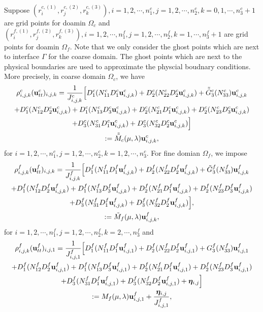 \documentclass[a4paper]{article}
\begin{document}
Suppose $(r^{c,(1)}_i, r^{c,(2)}_j, r^{c,(3)}_k), i = 1,2,\cdots,n_1^c, j = 1,2,\cdots,n_2^c,k=0,1,\cdots,n_3^c+1$ are grid points for doamin $\Omega_c$ and   $(r^{f,(1)}_i, r^{f,(2)}_j, r^{f,(3)}_k), i = 1,2,\cdots,n_1^f, j = 1,2,\cdots,n_2^f,k=1,\cdots,n_3^f+1$ are grid points for doamin $\Omega_f$. Note that we only consider the ghost points which are next to interface $\Gamma$ for the coarse domain. The ghost points which are next to the physical boundaries are used to approximate the physcial boudnary conditions. More precisely, in coarse domain $\Omega_c$, we have
\begin{multline}\label{coarse_scheme}
\rho_{i,j,k}^c ({\bf u}_{tt}^c)_{i,j,k} = \frac{1}{J_{i,j,k}^c}\Big[D_1^c(N_{11}^cD_1^c{\bf u}_{i,j,k}^c)+D_2^c(N_{22}^cD_2^c{\bf u}_{i,j,k}^c)+\tilde{\tilde{G}}_3^c(N_{33}^c){\bf u}_{i,j,k}^c\\
+D_1^c(N_{12}^cD_2^c{\bf u}_{i,j,k}^c)+D_1^c(N_{13}^cD_3^c{\bf u}_{i,j,k}^c)+D_2^c(N_{21}^cD_1^c{\bf u}_{i,j,k}^c)+D_2^c(N_{23}^cD_3^c{\bf u}_{i,j,k}^c)\\
+D_3^c(N_{31}^cD_1^c{\bf u}_{i,j,k}^c)+D_3^c(N_{32}^cD_2^c{\bf u}_{i,j,k}^c)\Big] \\
:= \tilde{\tilde{M}}_c(\mu,\lambda) {\bf{u}}^c_{i,j,k},
\end{multline}
for $ i = 1,2,\cdots,n_1^c, j = 1,2,\cdots,n_2^c, k = 1,2,\cdots,n_3^c$. For fine domian $\Omega_f$, we impose
\begin{multline}\label{fine_scheme_2}
\rho_{i,j,k}^f ({\bf u}_{tt}^f)_{i,j,k} =
 \frac{1}{J_{i,j,k}^f}\Big[D_1^f(N_{11}^fD_1^f{\bf u}_{i,j,k}^f)+D_2^f(N_{22}^fD_2^f{\bf u}_{i,j,k}^f)+\tilde{G}_3^f(N_{33}^f){\bf u}_{i,j,k}^f\\
+D_1^f(N_{12}^fD_2^f{\bf u}_{i,j,k}^f)+D_1^f(N_{13}^fD_3^f{\bf u}_{i,j,k}^f)
+D_2^f(N_{21}^fD_1^f{\bf u}_{i,j,k}^f)+D_2^f(N_{23}^fD_3^f{\bf u}_{i,j,k}^f)\\
+D_3^f(N_{31}^fD_1^f{\bf u}_{i,j,k}^f)
+D_3^f(N_{32}^fD_2^f{\bf u}_{i,j,k}^f)\Big], \\
:= \tilde{M}_f(\mu,\lambda) {\bf{u}}^f_{i,j,k},
\end{multline}
for $ i = 1,2,\cdots,n_1^f, j = 1,2,\cdots,n_2^f, k = 2,\cdots,n_3^f$ and
\begin{multline}\label{fine_scheme_1}
\rho_{i,j,k}^f ({\bf u}_{tt}^f)_{i,j,1} = \frac{1}{J_{i,j,1}^f}\Big[D_1^f(N_{11}^fD_1^f{\bf u}_{i,j,1}^f)+D_2^f(N_{22}^fD_2^f{\bf u}_{i,j,1}^f)+G_3^f(N_{33}^f){\bf u}_{i,j,1}^f\\
+D_1^f(N_{12}^fD_2^f{\bf u}_{i,j,1}^f)+D_1^f(N_{13}^fD_3^f{\bf u}_{i,j,1}^f)+D_2^f(N_{21}^fD_1^f{\bf u}_{i,j,1}^f)+D_2^f(N_{23}^fD_3^f{\bf u}_{i,j,1}^f)\\
+D_3^f(N_{31}^fD_1^f{\bf u}_{i,j,1}^f)+D_3^f(N_{32}^fD_2^f{\bf u}_{i,j,1}^f)+{\bm \eta}_{i,j}\Big]\\
 := M_f(\mu,\lambda){\bf u}^f_{i,j,1}+\frac{{\bm \eta}_{i,j}}{J^f_{i,j,1}},
\end{multline}
\end{document}
